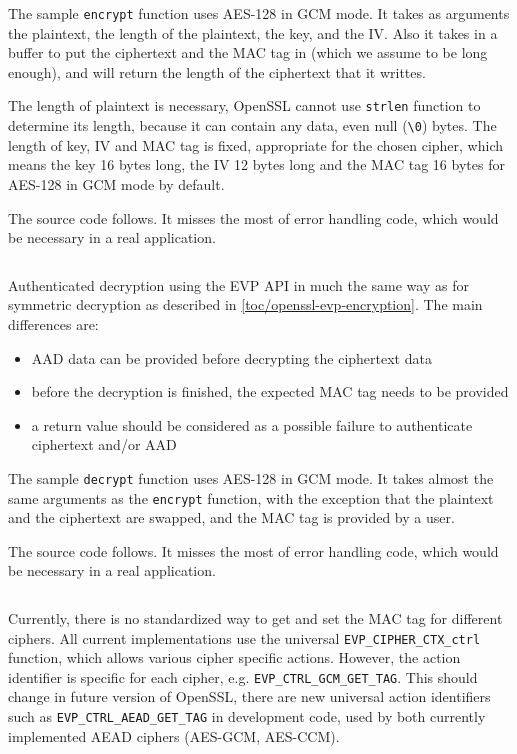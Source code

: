 The sample \texttt{encrypt} function uses AES-128 in GCM mode. It takes as arguments the plaintext, the length of the plaintext, the key, and the IV. Also it takes in a buffer to put the ciphertext and the MAC tag in (which we assume to be long enough), and will return the length of the ciphertext that it writtes.

The length of plaintext is necessary, OpenSSL cannot use \texttt{strlen} function to determine its length, because it can contain any data, even null (\texttt{\textbackslash0}) bytes. The length of key, IV and MAC tag is fixed, appropriate for the chosen cipher, which means the key 16 bytes long, the IV 12 bytes long and the MAC tag 16 bytes for AES-128 in GCM mode by default.

The source code follows. It misses the most of error handling code, which would be necessary in a real application.

\inputminted{c}{code/openssl-evp-aead-encrypt.c}

Authenticated decryption using the EVP API in much the same way as for symmetric decryption as described in \autoref{toc/openssl-evp-encryption}. The main differences are:

\begin{itemize}
  \item AAD data can be provided before decrypting the ciphertext data
  \item before the decryption is finished, the expected MAC tag needs to be provided
  \item a return value should be considered as a possible failure to authenticate ciphertext and/or AAD
\end{itemize}

The sample \texttt{decrypt} function uses AES-128 in GCM mode. It takes almost the same arguments as the \texttt{encrypt} function, with the exception that the plaintext and the ciphertext are swapped, and the MAC tag is provided by a user.

The source code follows. It misses the most of error handling code, which would be necessary in a real application.

\inputminted{c}{code/openssl-evp-aead-decrypt.c}

Currently, there is no standardized way to get and set the MAC tag for different ciphers. All current implementations use the universal \texttt{EVP\_CIPHER\_CTX\_ctrl} function, which allows various cipher specific actions. However, the action identifier is specific for each cipher, e.g. \texttt{EVP\_CTRL\_GCM\_GET\_TAG}. This should change in future version of OpenSSL, there are new universal action identifiers such as \texttt{EVP\_CTRL\_AEAD\_GET\_TAG} in development code, used by both currently implemented AEAD ciphers (AES-GCM, AES-CCM).
